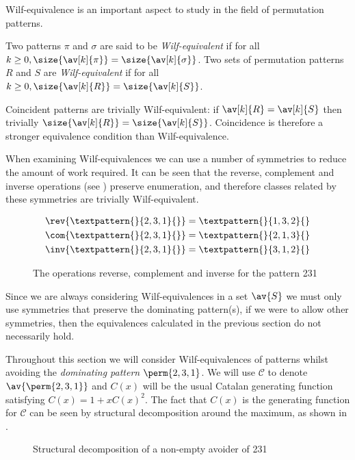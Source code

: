 Wilf-equivalence is an important aspect to study in the field of permutation
patterns.

\begin{definition}
  Two patterns \(\pi\) and \(\sigma\) are said to be \emph{Wilf-equivalent}
  if for all \(k\ge0, \size{\av[k]{\pi}} = \size{\av[k]{\sigma}}\). Two sets of
  permutation patterns \(R\) and \(S\) are \emph{Wilf-equivalent} if for all
  \(k\ge0, \size{\av[k]{R}} = \size{\av[k]{S}}\).
\end{definition}

Coincident patterns are trivially Wilf-equivalent: if \(\av[k]{R} = \av[k]{S}\)
then trivially \(\size{\av[k]{R}} = \size{\av[k]{S}}\). Coincidence is
therefore a stronger equivalence condition than Wilf-equivalence.

When examining Wilf-equivalences we can use a number of symmetries to reduce
the amount of work required. It can be seen that the reverse, complement
and inverse operations (see ) preserve enumeration, and
therefore classes related by these symmetries are trivially
Wilf-equivalent.
\begin{figure}[!htb]
\begin{align*}
    \rev{\textpattern{}{2,3,1}{}} &= \textpattern{}{1,3,2}{}\\
    \com{\textpattern{}{2,3,1}{}} &= \textpattern{}{2,1,3}{}\\
    \inv{\textpattern{}{2,3,1}{}} &= \textpattern{}{3,1,2}{}
\end{align*}
\caption{The operations reverse, complement and inverse for the pattern 231}
\label{fig:symm}
\end{figure}

Since we are always considering Wilf-equivalences in a set \(\av{S}\) we
must only use symmetries that preserve the dominating pattern(s), if we
were to allow other symmetries, then the equivalences calculated in the
previous section do not necessarily hold.

Throughout this section we will consider Wilf-equivalences of patterns
whilst avoiding the \emph{dominating pattern} \(\perm{2,3,1}\). We will
use \(\mathcal{C}\) to denote \(\av{\perm{2,3,1}}\) and \(C(x)\) will
be the usual Catalan generating function satisfying \(C(x) = 1 + xC(x)^2\).
The fact that \(C(x)\) is the generating function for \(\mathcal{C}\)
can be seen by structural decomposition around the maximum, as
shown in .

\begin{figure}[!ht]
    \centering
    \caption{Structural decomposition of a non-empty avoider of 231}
    \label{fig:decompmax}
\end{figure}


